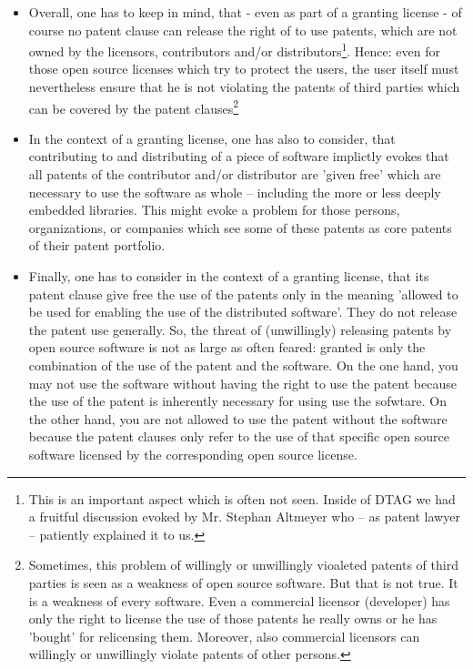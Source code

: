 \begin{itemize}
  
  \item  Overall, one has to keep in mind, that - even as part of a granting
  license - of course no patent clause can release the right of to use patents,
  which are not owned by the licensors, contributors and/or
  distributors\footnote{This is an important aspect which is often not seen.
  Inside of DTAG we had a fruitful discussion evoked by Mr. Stephan Altmeyer who
  -- as patent lawyer -- patiently explained it to us.}. Hence: even for those
  open source licenses which try to protect the users, the user itself must
  nevertheless ensure that he is not violating the patents of third parties
  which can be covered by the patent clauses\footnote{Sometimes, this problem of
  willingly or unwillingly vioaleted patents of third parties is seen as a
  weakness of open source software. But that is not true. It is a weakness of
  every software. Even a commercial licensor (developer) has only the right to
  license the use of those patents he really owns or he has 'bought' for
  relicensing them. Moreover, also commercial licensors can willingly or
  unwillingly violate patents of other persons.}
  
  \item In the context of a granting license, one has also to consider, that
  contributing to and distributing of a piece of software implictly evokes that
  all patents of the contributor and/or distributor are 'given free' which are
  necessary to use the software as whole -- including the more or less deeply
  embedded libraries. This might evoke a problem for those persons,
  organizations, or companies which see some of these patents as core patents of
  their patent portfolio.
  
  \item Finally, one has to consider in the context of a granting license, that
  its patent clause give free the use of the patents only in the meaning
  'allowed to be used for enabling the use of the distributed software'. They do
  not release the patent use generally. So, the threat of (unwillingly)
  releasing patents by open source software is not as large as often feared:
  granted is only the combination of the use of the patent and the software. On
  the one hand, you may not use the software without having the right to use the
  patent because the use of the patent is inherently necessary for using use the
  sofwtare. On the other hand, you are not allowed to use the patent without the
  software because the patent clauses only refer to the use of that specific
  open source software licensed by the corresponding open source license.


\end{itemize}
